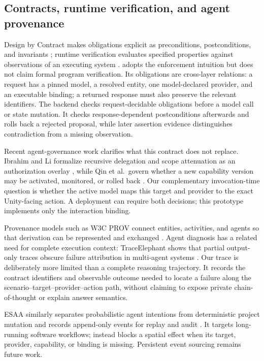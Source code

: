 \subsection{Contracts, runtime verification, and agent provenance}

Design by Contract makes obligations explicit as preconditions, postconditions,
and invariants \cite{meyer1992contract}; runtime verification evaluates
specified properties against observations of an executing system
\cite{leucker2009runtime}. \systemname{} adopts the enforcement intuition but
does not claim formal program verification. Its obligations are cross-layer
relations: a request has a pinned model, a resolved entity, one model-declared
provider, and an executable binding; a returned response must also preserve the
relevant identifiers. The backend checks request-decidable obligations before a
model call or state mutation. It checks response-dependent postconditions
afterwards and rolls back a rejected proposal, while later assertion evidence
distinguishes contradiction from a missing observation.

Recent agent-governance work clarifies what this contract does not replace.
Ibrahim and Li formalize recursive delegation and scope attenuation as an
authorization overlay \cite{ibrahim2026overlaying}, while Qin et al.\ govern
whether a new capability version may be activated, monitored, or rolled back
\cite{qin2026governed}. Our complementary invocation-time question is whether
the active model maps this target and provider to the exact Unity-facing action.
A deployment can require both decisions; this prototype implements only the
interaction binding.

Provenance models such as W3C PROV connect entities, activities, and agents so
that derivation can be represented and exchanged \cite{lebo2013provo}. Agent
diagnosis has a related need for complete execution context: TraceElephant
shows that partial output-only traces obscure failure attribution in
multi-agent systems \cite{chen2026elephant}. Our trace is deliberately more
limited than a complete reasoning trajectory. It records the contract
identifiers and observable outcome needed to locate a failure along the
scenario--target--provider--action path, without claiming to expose private
chain-of-thought or explain answer semantics.

ESAA similarly separates probabilistic agent intentions from deterministic
project mutation and records append-only events for replay and audit
\cite{santosfilho2026esaa}. It targets long-running software workflows;
\systemname{} instead blocks a spatial effect when its target, provider,
capability, or binding is missing. Persistent event sourcing remains future
work.

